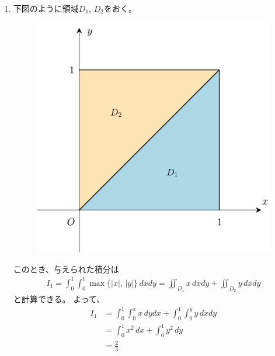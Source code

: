 \begin{ans*}
  ${}$
  \begin{enumerate}[label=(\alph*)]
    \item 下図のように領域$D_1,\,D_2$をおく。
    \begin{figure}[H]\centering
      \includegraphics[width=.4\linewidth]{./src/fig/Basic/B_2019_spring_1-2-a.png}
    \end{figure}
    このとき、与えられた積分は
    \begin{gather}
      I_{1} = \int_{0}^{1}\int_{0}^{1} \max\{|x|,\,|y|\}\,dxdy
      = \iint_{D_1} x\,dxdy + \iint_{D_2}y\,dxdy
    \end{gather}
    と計算できる。
    よって、
    \begin{align}
      I_{1}
      &= \int_{0}^{1}\int_{0}^{x} x\,dydx + \int_{0}^{1}\int_{0}^{y} y\, dxdy \\
      &= \int_{0}^{1}x^2\,dx + \int_{0}^{1}y^2\,dy \\
      &= \frac{2}{3}
    \end{align}


\end{enumerate}
\end{ans*}
